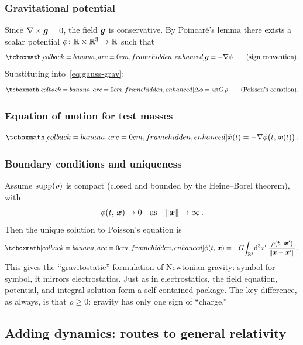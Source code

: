 \subsubsection{Gravitational potential}
Since $\nabla\times\boldsymbol{g} = 0$, the field $\boldsymbol{g}$ is conservative.
By Poincar\'e's lemma there exists a scalar potential
$\phi\colon \mathbb{R}\times\mathbb{R}^{3}\to\mathbb{R}$ such that
\begin{equation}\label{eq:g-from-phi}
  \eqbox{\vb{g} = -\nabla\phi}
  \qquad\text{(sign convention).}
\end{equation}
Substituting into~\eqref{eq:gauss-grav}:
\begin{equation}\label{eq:poisson}
  \eqbox{\lap\phi = 4\pi\grav\,\rho}
  \qquad\text{(Poisson's equation).}
\end{equation}

\subsubsection{Equation of motion for test masses}
\begin{equation}\label{eq:eom-potential}
  \eqbox{\ddt{\vb{x}}(t) = -\nabla\phi\big(t,\,\vb{x}(t)\big)\,.}
\end{equation}

\subsubsection{Boundary conditions and uniqueness}
Assume $\operatorname{supp}(\rho)$ is compact (closed and bounded by the Heine--Borel
theorem), with
\[
  \phi(t,\,\boldsymbol{x}) \to 0 \quad\text{as}\quad \lVert \boldsymbol{x} \rVert\to\infty\,.
\]
Then the unique solution to Poisson's equation is
\begin{equation}\label{eq:poisson-solution}
  \eqbox{\phi(t,\,\vb{x})
    = -\grav\!\int_{\Rn{3}}\!\dd^3 x'\;
      \frac{\rho(t,\,\vb{x}')}{\norm{\vb{x} - \vb{x}'}}\,.}
\end{equation}
This gives the ``gravitostatic'' formulation of Newtonian gravity:
symbol for symbol, it mirrors electrostatics.  Just as in
electrostatics, the field equation, potential, and integral solution
form a self-contained package.  The key difference, as always, is
that $\rho \geq 0$: gravity has only one sign of ``charge.''

\subsection{Adding dynamics: routes to general relativity}

